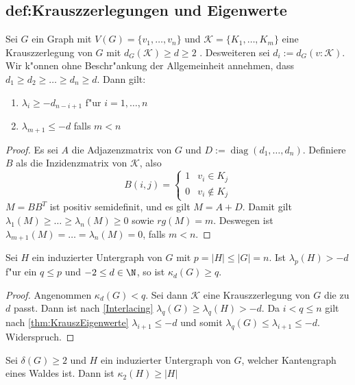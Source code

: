 \subsection{def:Krauszzerlegungen und Eigenwerte}
\begin{theorem}
    \label{thm:KrauszEigenwerte}
    Sei $G$ ein Graph mit $V(G)=\{v_1,\dots,v_n\}$ und $\mathcal K=\{K_1,\dots,K_m\}$ eine Krauszzerlegung von $G$ mit $d_G(\mathcal K) \geq d \geq 2$ . Desweiteren sei $d_i := d_G(v:\mathcal K)$. 
    Wir k"onnen ohne Beschr"ankung der Allgemeinheit annehmen, dass $d_1\geq d_2 \geq \dots \geq d_n \geq d$.
    Dann gilt: 
    \begin{enumerate}[label=(\alph*)]
        \item $\lambda_i \geq -d_{n-i+1}$ f"ur $i = 1, \dots , n$
        \item $\lambda_{m+1} \leq -d$ falls $m < n$
    \end{enumerate}
\end{theorem}
\begin{proof}
    Es sei $A$ die Adjazenzmatrix von $G$ und $D := \operatorname{diag}(d_1,\dots,d_n)$. Definiere $B$ als die Inzidenzmatrix von $\mathcal K$, also $$B(i,j) = \begin{cases}
        1 & v_i \in K_j \\ 0 & v_i \notin K_j
    \end{cases}$$ 
    $M=BB^{T}$ ist positiv semidefinit, und es gilt $M = A+D$. Damit gilt $\lambda_1(M) \geq \dots \geq \lambda_n(M) \geq 0$ sowie $rg(M) = m$. Deswegen ist $\lambda_{m+1}(M)=\dots=\lambda_n(M) = 0$, falls $m < n$. 
\end{proof}
\begin{corollary}
    \label{cor:Korollar1}
    Sei $H$ ein induzierter Untergraph von $G$ mit $p = \left| H\right| \leq \left|G\right| = n$.
    Ist $\lambda_p (H) > -d $ f"ur ein $q \leq p$ und $-2 \leq d \in \N$, so ist $\kappa_d(G) \geq q$.
\end{corollary}
\begin{proof}
    Angenommen $\kappa_d(G) < q$. Sei dann $\mathcal{K}$ eine Krauszzerlegung von $G$ die zu $d$ passt. Dann ist nach \ref{Interlacing} $\lambda_{q}(G)\geq \lambda_{q}(H) > -d$. 
    Da $i < q \leq n$ gilt nach \ref{thm:KrauszEigenwerte} $\lambda_{i+1}\leq -d$ und somit $\lambda_{q}(G)\leq \lambda_{i+1} \leq -d$. Widerspruch.
\end{proof}

\begin{corollary}
    Sei $\delta(G) \geq 2$ und $H$ ein induzierter Untergraph von $G$, welcher Kantengraph eines Waldes ist. 
    Dann ist $\kappa_{2}(H)\geq \left|H\right|$
\end{corollary}

